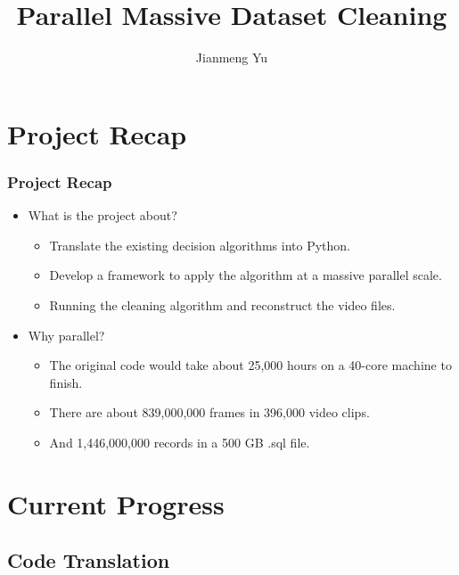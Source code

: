 \documentclass{beamer}[fullspacing]
\begin{document}
\title{Parallel Massive Dataset Cleaning}
\author{Jianmeng Yu}
\date{}


\begin{frame}
\titlepage
\end{frame}


\begin{frame}
\tableofcontents
\end{frame}


\section{Project Recap}

\begin{frame}
\frametitle{Project Recap}

\begin{itemize}
\item What is the project about?
\begin{itemize}
\item Translate the existing decision algorithms into Python.
\item Develop a framework to apply the algorithm at a massive parallel scale.
\item Running the cleaning algorithm and reconstruct the video files.
\end{itemize}
\item Why parallel?
\begin{itemize}
\item The original code would take about 25,000 hours on a 40-core machine to finish.
\item There are about 839,000,000 frames in 396,000 video clips.
\item And 1,446,000,000 records in a 500 GB .sql file.
\end{itemize}
\end{itemize}

\end{frame}

\section{Current Progress}
\subsection{Code Translation}
\end{document}
